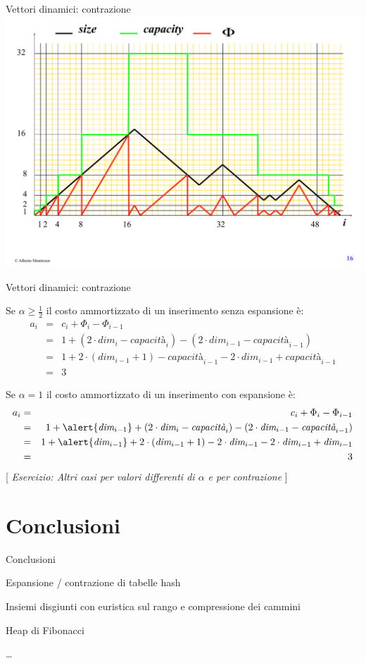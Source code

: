 \begin{frame}[shrink]{Vettori dinamici: contrazione}
	\includegraphics{dynvector.pdf}
\end{frame}

\begin{frame}[shrink]{Vettori dinamici: contrazione}

Se $\alpha \geq \frac{1}{2}$ il costo ammortizzato di un inserimento senza espansione è: 
{\small
\begin{eqnarray*}
a_i &=& c_i + \Phi_i - \Phi_{i-1} \\
    &=& 1 + ( 2 \cdot \textit{dim}_i - \textit{capacità}_i) - ( 2 \cdot \textit{dim}_{i-1} - \textit{capacità}_{i-1})\\
    &=& 1 +  2 \cdot (\textit{dim}_{i-1}+1) - \textit{capacità}_{i-1} -  2 \cdot \textit{dim}_{i-1} + \textit{capacità}_{i-1}\\
    &=& 3
\end{eqnarray*}
}

Se $\alpha = 1$ il costo ammortizzato di un inserimento \alert{con espansione} è: 
{\small
\begin{eqnarray*}
a_i &=& c_i + \Phi_i - \Phi_{i-1} \\
    &=& 1 + \alert{\textit{dim}_{i-1}} + ( 2 \cdot \textit{dim}_i - \textit{capacità}_i) - ( 2 \cdot \textit{dim}_{i-1} - \textit{capacità}_{i-1})\\
    &=& 1 + \alert{\textit{dim}_{i-1}} +  2 \cdot (\textit{dim}_{i-1}+1) - 2 \cdot \textit{dim}_{i-1} -  2 \cdot \textit{dim}_{i-1} + \textit{dim}_{i-1}\\
    &=& 3
\end{eqnarray*}
}
[ \emph{Esercizio: Altri casi per valori differenti di $\alpha$ e per contrazione} ]
\end{frame}

\section{Conclusioni}

\begin{frame}{Conclusioni}
\BIL
\item Espansione / contrazione di tabelle hash
\item Insiemi disgiunti con euristica sul rango e compressione dei cammini
\item Heap di Fibonacci
\item \ldots
\EIL
	
\end{frame}





